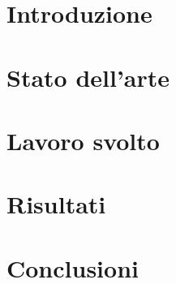 \section{Introduzione}
\section{Stato dell'arte}
\section{Lavoro svolto}
\section{Risultati}
\section{Conclusioni}